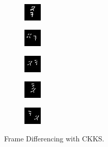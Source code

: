 \\ \bigskip
\begin{subfigure}[t]{0.9\textwidth}
    \centering
    \begin{subfigure}[t]{0.19\textwidth}
        \centering
        \includegraphics[scale=2]{figures/CKKS-DIFFERENCING/frame0}
    \end{subfigure}
    \hfill
    \begin{subfigure}[t]{0.19\textwidth}
        \centering
        \includegraphics[scale=2]{figures/CKKS-DIFFERENCING/frame4}
    \end{subfigure}
    \hfill
    \begin{subfigure}[t]{0.19\textwidth}
        \centering
        \includegraphics[scale=2]{figures/CKKS-DIFFERENCING/frame8}
    \end{subfigure}
    \hfill
    \begin{subfigure}[t]{0.19\textwidth}
        \centering
        \includegraphics[scale=2]{figures/CKKS-DIFFERENCING/frame12}
    \end{subfigure}
    \hfill
    \begin{subfigure}[t]{0.19\textwidth}
        \centering
        \includegraphics[scale=2]{figures/CKKS-DIFFERENCING/frame16}
    \end{subfigure}
    \caption{Frame Differencing with CKKS.}
\end{subfigure}
\\ \bigskip
